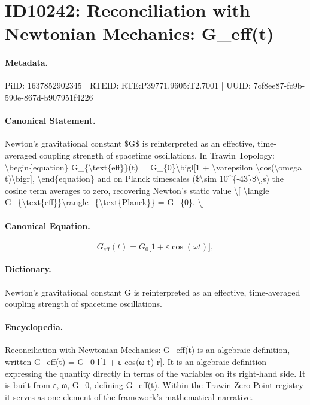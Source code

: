 \section*{ID10242: Reconciliation with Newtonian Mechanics: G\_eff(t)}
\paragraph{Metadata.}
PiID: 1637852902345 | RTEID: RTE:P39771.9605:T2.7001 | UUID: 7cf8ee87-fc9b-590e-867d-b907951f4226

\paragraph{Canonical Statement.}
Newton's gravitational constant \$G\$ is reinterpreted as an effective, time-averaged coupling strength of spacetime oscillations. In Trawin Topology: \textbackslash{}begin\{equation\} G\_\{\textbackslash{}text\{eff\}\}(t) = G\_\{0\}\textbackslash{}bigl[1 + \textbackslash{}varepsilon \textbackslash{}cos(\textbackslash{}omega t)\textbackslash{}bigr], \textbackslash{}end\{equation\} and on Planck timescales (\$\textbackslash{}sim 10\textasciicircum{}\{-43\}\$\textbackslash{},s) the cosine term averages to zero, recovering Newton's static value \textbackslash{}[ \textbackslash{}langle G\_\{\textbackslash{}text\{eff\}\}\textbackslash{}rangle\_\{\textbackslash{}text\{Planck\}\} = G\_\{0\}. \textbackslash{}]

\paragraph{Canonical Equation.}
\[
G_{\text{eff}}(t) = G_{0}\bigl[1 + \varepsilon \cos(\omega t)\bigr],
\]

\paragraph{Dictionary.}
Newton's gravitational constant G is reinterpreted as an effective, time-averaged coupling strength of spacetime oscillations.

\paragraph{Encyclopedia.}
Reconciliation with Newtonian Mechanics: G\_eff(t) is an algebraic definition, written G\_eff(t) = G\_0 l[1 + ε cos(ω t) r]. It is an algebraic definition expressing the quantity directly in terms of the variables on its right-hand side. It is built from ε, ω, G\_0, defining G\_eff(t). Within the Trawin Zero Point registry it serves as one element of the framework's mathematical narrative.
